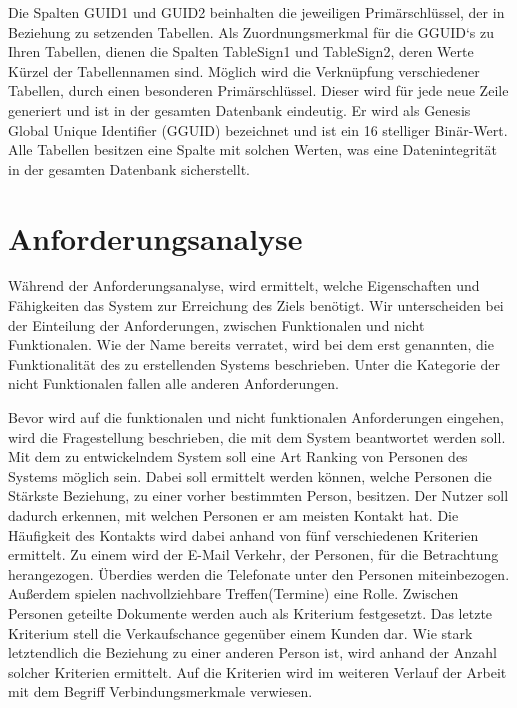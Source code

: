Die Spalten GUID1 und GUID2 beinhalten die jeweiligen Primärschlüssel, der in Beziehung zu setzenden Tabellen. Als Zuordnungsmerkmal für die GGUID`s zu Ihren Tabellen, dienen die Spalten TableSign1 und TableSign2, deren Werte Kürzel der Tabellennamen sind. Möglich wird die Verknüpfung verschiedener Tabellen, durch einen besonderen Primärschlüssel. Dieser wird für jede neue Zeile generiert und ist in der gesamten Datenbank eindeutig. Er wird als Genesis Global Unique Identifier (GGUID) bezeichnet und ist ein 16 stelliger Binär-Wert. Alle Tabellen besitzen eine Spalte mit solchen Werten, was eine Datenintegrität in der gesamten Datenbank sicherstellt.

\section{Anforderungsanalyse}
\label{ch:Systemanalyse:sec:Anforderungsanalyse}

Während der Anforderungsanalyse, wird ermittelt, welche Eigenschaften und Fähigkeiten das System zur Erreichung des Ziels benötigt. Wir unterscheiden bei der Einteilung der Anforderungen, zwischen Funktionalen und nicht Funktionalen. Wie der Name bereits verratet, wird bei dem erst genannten, die Funktionalität des zu erstellenden Systems beschrieben. Unter die Kategorie der nicht Funktionalen fallen alle anderen Anforderungen. 

Bevor wird auf die funktionalen und nicht funktionalen Anforderungen eingehen, wird die Fragestellung beschrieben, die mit dem System beantwortet werden soll. Mit dem zu entwickelndem System soll eine Art Ranking von Personen des Systems möglich sein. Dabei soll ermittelt werden können, welche Personen die Stärkste Beziehung, zu einer vorher bestimmten Person, besitzen. Der Nutzer soll dadurch erkennen, mit welchen Personen er am meisten Kontakt hat. Die Häufigkeit des Kontakts wird dabei anhand von fünf verschiedenen Kriterien ermittelt. Zu einem wird der E-Mail Verkehr, der Personen, für die Betrachtung herangezogen. Überdies werden die Telefonate unter den Personen miteinbezogen. Außerdem spielen nachvollziehbare Treffen(Termine) eine Rolle. Zwischen Personen geteilte Dokumente werden auch als Kriterium festgesetzt. Das letzte Kriterium stell die Verkaufschance gegenüber einem Kunden dar. Wie stark letztendlich die Beziehung zu einer anderen Person ist, wird anhand der Anzahl solcher Kriterien ermittelt. Auf die Kriterien wird im weiteren Verlauf der Arbeit mit dem Begriff Verbindungsmerkmale verwiesen.   

